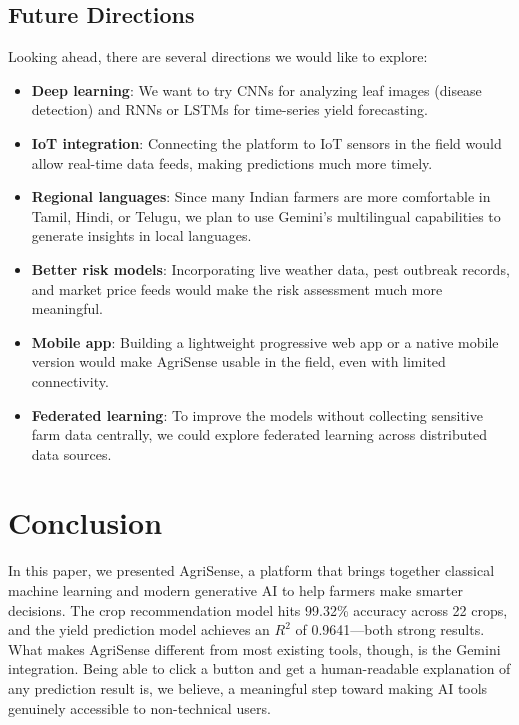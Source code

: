 \documentclass[conference]{IEEEtran}
\begin{document}
\subsection{Future Directions}
Looking ahead, there are several directions we would like to explore:

\begin{itemize}
    \item \textbf{Deep learning}: We want to try CNNs for analyzing leaf images (disease detection) and RNNs or LSTMs for time-series yield forecasting.
    \item \textbf{IoT integration}: Connecting the platform to IoT sensors in the field would allow real-time data feeds, making predictions much more timely.
    \item \textbf{Regional languages}: Since many Indian farmers are more comfortable in Tamil, Hindi, or Telugu, we plan to use Gemini's multilingual capabilities to generate insights in local languages.
    \item \textbf{Better risk models}: Incorporating live weather data, pest outbreak records, and market price feeds would make the risk assessment much more meaningful.
    \item \textbf{Mobile app}: Building a lightweight progressive web app or a native mobile version would make AgriSense usable in the field, even with limited connectivity.
    \item \textbf{Federated learning}: To improve the models without collecting sensitive farm data centrally, we could explore federated learning across distributed data sources.
\end{itemize}

\section{Conclusion}
\label{sec:conclusion}

In this paper, we presented AgriSense, a platform that brings together classical machine learning and modern generative AI to help farmers make smarter decisions. The crop recommendation model hits 99.32\% accuracy across 22 crops, and the yield prediction model achieves an $R^2$ of 0.9641---both strong results. What makes AgriSense different from most existing tools, though, is the Gemini integration. Being able to click a button and get a human-readable explanation of any prediction result is, we believe, a meaningful step toward making AI tools genuinely accessible to non-technical users.
\end{document}
